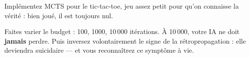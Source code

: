 \begin{nkexo}
Implémentez MCTS pour le tic-tac-toe, jeu assez petit pour qu'on connaisse la
vérité : bien joué, il est toujours nul.

Faites varier le budget : 100, 1000, 10\,000 itérations. À 10\,000, votre IA ne
doit \textbf{jamais} perdre. Puis inversez volontairement le signe de la
rétropropagation : elle deviendra suicidaire — et vous reconnaîtrez ce symptôme
à vie.
\end{nkexo}
